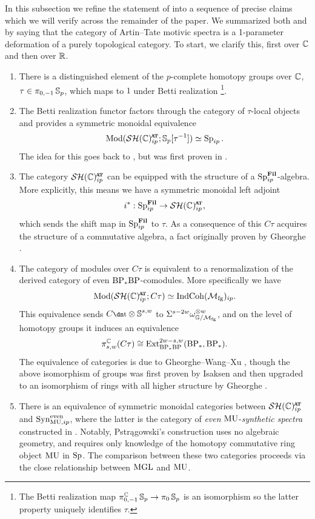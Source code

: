 In this subsection we refine the statement of  into a sequence of precise claims which we will verify across the remainder of the paper. We summarized both  and  by saying that the category of Artin--Tate motivic spectra is a 1-parameter deformation of a purely topological category. To start, we clarify this, first over $\mathbb{C}$ and then over $\mathbb{R}$.

\begin{enumerate}
\item There is a distinguished element of the $p$-complete homotopy groups over $\mathbb{C}$,
  $\tau \in \pi_{0,-1}\operatorname{\mathbb{S}}_p$, which maps to $1$ under Betti realization \footnote{The Betti realization map $\pi^{\mathbb{C}}_{0,-1}\operatorname{\mathbb{S}}_p \to \pi_0\operatorname{\mathbb{S}}_p$ is an isomorphism so the latter property uniquely identifies $\tau$.}. \cite[Lemma 23]{HKO}
\item The Betti realization functor factors through the category of $\tau$-local objects and provides a symmetric monoidal equivalence
  \[ \Mod ( \SHCat ; \Ss_p[\tau^{-1}] ) \simeq \Sp_{ip}. \]
  The idea for this goes back to \cite[Section 2.6]{DI}, but was first proven in \cite{Pstragowski}.  
\item The category $\SHCat$ can be equipped with the structure of a $\operatorname{\mathrm{Sp}}_{ip}^{\operatorname{\mathbf{Fil}}}$-algebra.
  More explicitly, this means we have a symmetric monoidal left adjoint
  \[ i^* : \Sp_{ip}^{\Fil} \to \SHCat, \]
  which sends the shift map in $\operatorname{\mathrm{Sp}}_{ip}^{\operatorname{\mathbf{Fil}}}$ to $\tau$. As a consequence of this $C\tau$ acquires the structure of a commutative algebra, a fact originally proven by Gheorghe \cite{Ctau}.
\item The category of modules over $C\tau$ is equivalent to a renormalization of the derived category of even $\mathrm{BP}_*\mathrm{BP}$-comodules. More specifically we have
  \[ \Mod ( \SHCat ; C\tau ) \simeq \IndCoh ( \Mfg )_{ip}. \]
  This equivalence sends $C\ta \otimes \Ss^{s,w}$ to $\Sigma^{s-2w} \omega_{\mathbb{G}/\mathcal{M}_{\mathrm{fg}}} ^{\otimes w}$, 
  and on the level of homotopy groups it induces an equivalence
    \[ \pi_{s,w}^{\mathbb{C}}(C\tau) \cong \operatorname{\mathrm{Ext}}_{\mathrm{BP}_*\mathrm{BP}}^{2w-s,w}(\mathrm{BP}_*, \mathrm{BP}_*). \] 
    The equivalence of categories is due to Gheorghe--Wang--Xu \cite{ctauactalol}, though the above isomorphism of groups was first proven by Isaksen \cite[Proposition 6.2.5]{StableStems} and then upgraded to an isomorphism of rings with all higher structure by Gheorghe \cite{Ctau}.
  \item There is an equivalence of symmetric monoidal categories between $\SHCat$ and $\mathrm{Syn}_{\operatorname{\mathrm{MU}}, ip}^{\mathrm{even}}$, where the latter is the category of \emph{even} $\operatorname{\mathrm{MU}}$-\emph{synthetic spectra} constructed in \cite{Pstragowski}. Notably, Pstr\k{a}gowski's construction uses no algebraic geometry, and requires only knowledge of the homotopy commutative ring object $\operatorname{\mathrm{MU}}$ in $\operatorname{\mathrm{Sp}}$. The comparison between these two categories proceeds via the close relationship between $\mathrm{MGL}$ and $\operatorname{\mathrm{MU}}$. %

\end{enumerate}
